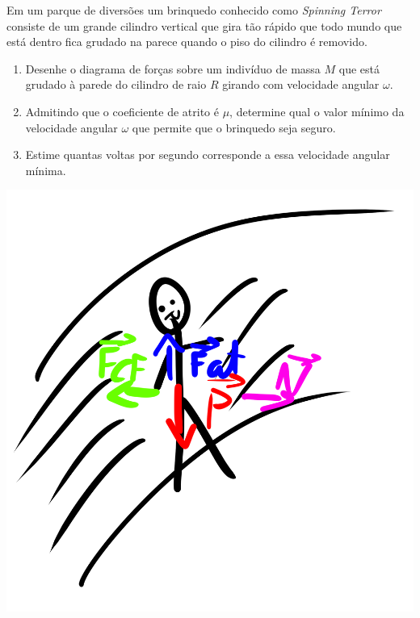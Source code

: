 \documentclass[]{IMTexam}
\author{Isabella B.}
\date{}
\begin{document}
\maketitle

\begin{questions}

	\question Em um parque de diversões um brinquedo conhecido como \textit{Spinning Terror} consiste de um grande cilindro vertical que gira tão rápido que todo mundo que está dentro fica grudado na parece quando o piso do cilindro é removido.

	\begin{enumerate}
		\item Desenhe o diagrama de forças sobre um indivíduo de massa $ M $ que está grudado à parede do cilindro de raio $ R $ girando com velocidade angular $ \omega $.
		\item Admitindo que o coeficiente de atrito é $ \mu $, determine qual o valor mínimo da velocidade angular $ \omega $ que permite que o brinquedo seja seguro.
		\item Estime quantas voltas por segundo corresponde a essa velocidade angular mínima.
	\end{enumerate}

	\begin{solution}

		\topenum
		\begin{multi}

			\includegraphics[width=1\linewidth]{fig4}


\end{multi}
\end{solution}
\end{questions}
\end{document}
